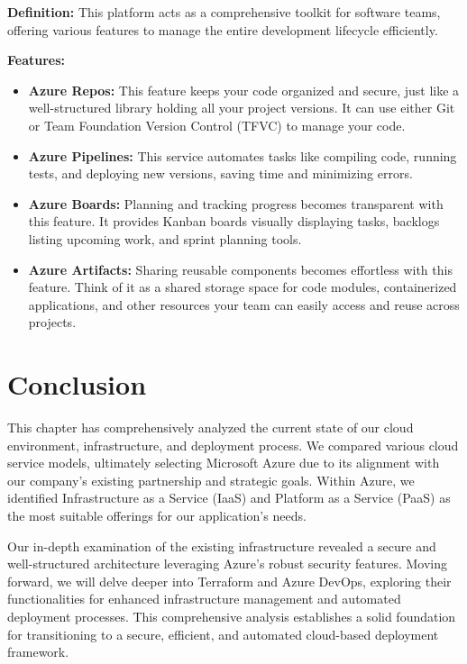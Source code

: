 \textbf{Definition:} This platform acts as a comprehensive toolkit for software teams, offering various features to manage the entire development lifecycle efficiently.
\par
\textbf{Features:} 
\begin{itemize}
    \item \textbf{Azure Repos:} This feature keeps your code organized and secure, just like a well-structured library holding all your project versions. It can use either Git or Team Foundation Version Control (TFVC) to manage your code.
    \item \textbf{Azure Pipelines:}  This service automates tasks like compiling code, running tests, and deploying new versions, saving time and minimizing errors.
    \item \textbf{Azure Boards:} Planning and tracking progress becomes transparent with this feature. It provides Kanban boards visually displaying tasks, backlogs listing upcoming work, and sprint planning tools.
    \item \textbf{Azure Artifacts:} Sharing reusable components becomes effortless with this feature. Think of it as a shared storage space for code modules, containerized applications, and other resources your team can easily access and reuse across projects.
\end{itemize}
\section*{Conclusion}
This chapter has comprehensively analyzed the current state of our cloud environment, infrastructure, and deployment process. We compared various cloud service models, ultimately selecting Microsoft Azure due to its alignment with our company's existing partnership and strategic goals. Within Azure, we identified Infrastructure as a Service (IaaS) and Platform as a Service (PaaS) as the most suitable offerings for our application's needs.
\par
Our in-depth examination of the existing infrastructure revealed a secure and well-structured architecture leveraging Azure's robust security features. Moving forward, we will delve deeper into Terraform and Azure DevOps, exploring their functionalities for enhanced infrastructure management and automated deployment processes. This comprehensive analysis establishes a solid foundation for transitioning to a secure, efficient, and automated cloud-based deployment framework.
